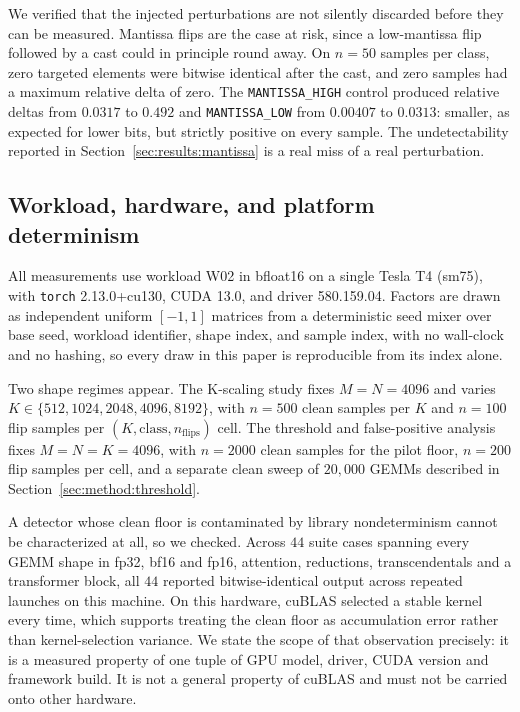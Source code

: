 We verified that the injected perturbations are not silently discarded before
they can be measured. Mantissa flips are the case at risk, since a
low-mantissa flip followed by a cast could in principle round away. On
$n = 50$ samples per class, zero targeted elements were bitwise identical after
the cast, and zero samples had a maximum relative delta of zero. The
\texttt{MANTISSA\_HIGH} control produced relative deltas from $0.0317$ to
$0.492$ and \texttt{MANTISSA\_LOW} from $0.00407$ to $0.0313$: smaller, as
expected for lower bits, but strictly positive on every sample. The
undetectability reported in Section~\ref{sec:results:mantissa} is a real miss
of a real perturbation.

\subsection{Workload, hardware, and platform determinism}
\label{sec:method:platform}

All measurements use workload W02 in bfloat16 on a single Tesla T4 (sm75),
with \texttt{torch} 2.13.0+cu130, CUDA 13.0, and driver 580.159.04. Factors are
drawn as independent uniform $[-1, 1]$ matrices from a deterministic seed mixer
over base seed, workload identifier, shape index, and sample index, with no
wall-clock and no hashing, so every draw in this paper is reproducible from its
index alone.

Two shape regimes appear. The K-scaling study fixes $M = N = 4096$ and varies
$K \in \{512, 1024, 2048, 4096, 8192\}$, with $n = 500$ clean samples per $K$
and $n = 100$ flip samples per $(K, \text{class}, n_{\text{flips}})$ cell. The
threshold and false-positive analysis fixes $M = N = K = 4096$, with $n = 2000$
clean samples for the pilot floor, $n = 200$ flip samples per cell, and a
separate clean sweep of $20{,}000$ GEMMs described in
Section~\ref{sec:method:threshold}.

A detector whose clean floor is contaminated by library nondeterminism cannot
be characterized at all, so we checked. Across $44$ suite cases spanning every
GEMM shape in fp32, bf16 and fp16, attention, reductions, transcendentals and a
transformer block, all $44$ reported bitwise-identical output across repeated
launches on this machine. On this hardware, cuBLAS selected a stable kernel
every time, which supports treating the clean floor as accumulation error
rather than kernel-selection variance. We state the scope of that observation
precisely: it is a measured property of one tuple of GPU model, driver, CUDA
version and framework build. It is not a general property of cuBLAS and must
not be carried onto other hardware.

